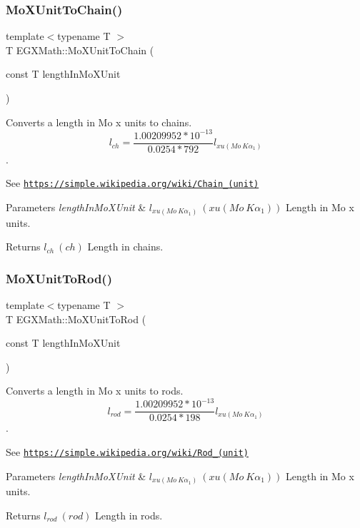 \subsubsection{\texorpdfstring{Mo\+X\+Unit\+To\+Chain()}{MoXUnitToChain()}}
{\footnotesize\ttfamily template$<$typename T $>$ \\
T E\+G\+X\+Math\+::\+Mo\+X\+Unit\+To\+Chain (\begin{DoxyParamCaption}\item[{const T}]{length\+In\+Mo\+X\+Unit }\end{DoxyParamCaption})}



Converts a length in Mo x units to chains. \[ l_{ch}= \frac{1.00209952*10^{-13}}{0.0254 * 792} l_{xu(Mo\ K\alpha_1)} \]. 

See \href{https://simple.wikipedia.org/wiki/Chain_(unit)}{\tt https\+://simple.\+wikipedia.\+org/wiki/\+Chain\+\_\+(unit)} 
\begin{DoxyParams}{Parameters}
{\em length\+In\+Mo\+X\+Unit} & $ l_{xu(Mo\ K\alpha_1)}\ (xu(Mo\ K\alpha_1))$ Length in Mo x units. \\
\hline
\end{DoxyParams}
\begin{DoxyReturn}{Returns}
$ l_{ch}\ (ch)$ Length in chains. 
\end{DoxyReturn}
\mbox{\label{group___e_g_x_math-_conversions-_length_conversions-_non-_s_i-_mo_x_unit-_surveyors_ga087c126bbeacfc3f9786ce20c1d9c2e1}} 
\subsubsection{\texorpdfstring{Mo\+X\+Unit\+To\+Rod()}{MoXUnitToRod()}}
{\footnotesize\ttfamily template$<$typename T $>$ \\
T E\+G\+X\+Math\+::\+Mo\+X\+Unit\+To\+Rod (\begin{DoxyParamCaption}\item[{const T}]{length\+In\+Mo\+X\+Unit }\end{DoxyParamCaption})}



Converts a length in Mo x units to rods. \[ l_{rod}= \frac{1.00209952*10^{-13}}{0.0254 * 198} l_{xu(Mo\ K\alpha_1)} \]. 

See \href{https://simple.wikipedia.org/wiki/Rod_(unit)}{\tt https\+://simple.\+wikipedia.\+org/wiki/\+Rod\+\_\+(unit)} 
\begin{DoxyParams}{Parameters}
{\em length\+In\+Mo\+X\+Unit} & $ l_{xu(Mo\ K\alpha_1)}\ (xu(Mo\ K\alpha_1))$ Length in Mo x units. \\
\hline
\end{DoxyParams}
\begin{DoxyReturn}{Returns}
$ l_{rod}\ (rod)$ Length in rods. 
\end{DoxyReturn}

